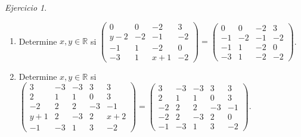 \documentclass[12pt]{article}
\theoremstyle{remark}
\newtheorem{Ejer}[definicion]{Ejercicio}
\begin{document}
\begin{Ejer}
\begin{enumerate}[resume=banco]
\item Determine $x,y\in\mathbb R$ si $\begin{pmatrix}0&0&-2&3\\y - 2&-2&-1&-2\\-1&1&-2&0\\-3&1&x + 1&-2\end{pmatrix}=\begin{pmatrix}0&0&-2&3\\-1&-2&-1&-2\\-1&1&-2&0\\-3&1&-2&-2\end{pmatrix}$.

\item Determine $x,y\in\mathbb R$ si $\begin{pmatrix}3&-3&-3&3&3\\2&1&1&0&3\\-2&2&2&-3&-1\\y + 1&2&-3&2&x + 2\\-1&-3&1&3&-2\end{pmatrix}=\begin{pmatrix}3&-3&-3&3&3\\2&1&1&0&3\\-2&2&2&-3&-1\\-2&2&-3&2&0\\-1&-3&1&3&-2\end{pmatrix}$.

\end{enumerate}
\end{Ejer}
\end{document}
